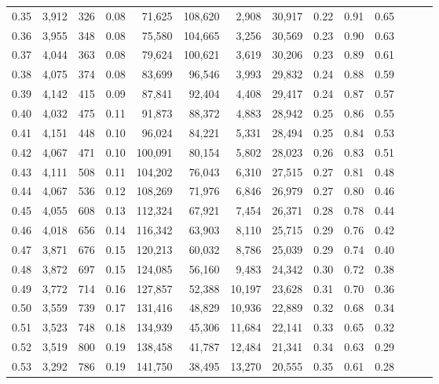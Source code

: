 \begin{tabular}{rrrrrrrrrrrrrr}
0.35 &  3,912 &  326 &  0.08 &   71,625 &  108,620 &   2,908 &  30,917 &  0.22 &  0.91 &      0.65 \\
0.36 &  3,955 &  348 &  0.08 &   75,580 &  104,665 &   3,256 &  30,569 &  0.23 &  0.90 &      0.63 \\
0.37 &  4,044 &  363 &  0.08 &   79,624 &  100,621 &   3,619 &  30,206 &  0.23 &  0.89 &      0.61 \\
0.38 &  4,075 &  374 &  0.08 &   83,699 &   96,546 &   3,993 &  29,832 &  0.24 &  0.88 &      0.59 \\
0.39 &  4,142 &  415 &  0.09 &   87,841 &   92,404 &   4,408 &  29,417 &  0.24 &  0.87 &      0.57 \\
0.40 &  4,032 &  475 &  0.11 &   91,873 &   88,372 &   4,883 &  28,942 &  0.25 &  0.86 &      0.55 \\
0.41 &  4,151 &  448 &  0.10 &   96,024 &   84,221 &   5,331 &  28,494 &  0.25 &  0.84 &      0.53 \\
0.42 &  4,067 &  471 &  0.10 &  100,091 &   80,154 &   5,802 &  28,023 &  0.26 &  0.83 &      0.51 \\
0.43 &  4,111 &  508 &  0.11 &  104,202 &   76,043 &   6,310 &  27,515 &  0.27 &  0.81 &      0.48 \\
0.44 &  4,067 &  536 &  0.12 &  108,269 &   71,976 &   6,846 &  26,979 &  0.27 &  0.80 &      0.46 \\
0.45 &  4,055 &  608 &  0.13 &  112,324 &   67,921 &   7,454 &  26,371 &  0.28 &  0.78 &      0.44 \\
0.46 &  4,018 &  656 &  0.14 &  116,342 &   63,903 &   8,110 &  25,715 &  0.29 &  0.76 &      0.42 \\
0.47 &  3,871 &  676 &  0.15 &  120,213 &   60,032 &   8,786 &  25,039 &  0.29 &  0.74 &      0.40 \\
0.48 &  3,872 &  697 &  0.15 &  124,085 &   56,160 &   9,483 &  24,342 &  0.30 &  0.72 &      0.38 \\
0.49 &  3,772 &  714 &  0.16 &  127,857 &   52,388 &  10,197 &  23,628 &  0.31 &  0.70 &      0.36 \\
0.50 &  3,559 &  739 &  0.17 &  131,416 &   48,829 &  10,936 &  22,889 &  0.32 &  0.68 &      0.34 \\
0.51 &  3,523 &  748 &  0.18 &  134,939 &   45,306 &  11,684 &  22,141 &  0.33 &  0.65 &      0.32 \\
0.52 &  3,519 &  800 &  0.19 &  138,458 &   41,787 &  12,484 &  21,341 &  0.34 &  0.63 &      0.29 \\
0.53 &  3,292 &  786 &  0.19 &  141,750 &   38,495 &  13,270 &  20,555 &  0.35 &  0.61 &      0.28 \\

\end{tabular}
